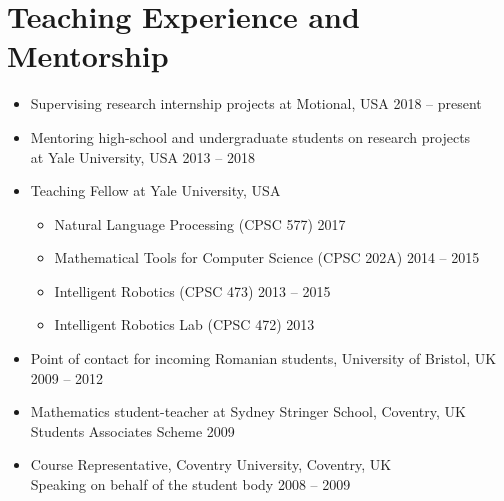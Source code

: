 \documentclass[10pt,letterpaper]{article}
\newcommand{\thing}[2]{{#1} \hfill {#2}}
\begin{document}
\section{Teaching Experience and Mentorship}
\begin{itemize}\setlength\itemsep{0em}
\item \thing{Supervising research internship projects at Motional, USA}{2018 -- present}
\item \thing{Mentoring high-school and undergraduate students on research projects \\ at Yale University, USA}{2013 -- 2018}
\item Teaching Fellow at Yale University, USA
	\begin{itemize}\setlength\itemsep{0em}
	\item \thing{Natural Language Processing (CPSC 577)}{2017}
	\item \thing{Mathematical Tools for Computer Science (CPSC 202A)}{2014 -- 2015}
	\item \thing{Intelligent Robotics (CPSC 473)}{2013 -- 2015}
	\item \thing{Intelligent Robotics Lab (CPSC 472)}{2013}
	\end{itemize}
\item \thing{Point of contact for incoming Romanian students, University of Bristol, UK}{2009 -- 2012}
\item \thing{Mathematics student-teacher at Sydney Stringer School, Coventry, UK\\Students Associates Scheme}{2009}
\item \thing{Course Representative, Coventry University, Coventry, UK\\Speaking on behalf of the student body}{2008 -- 2009}
\end{itemize}
\end{document}
